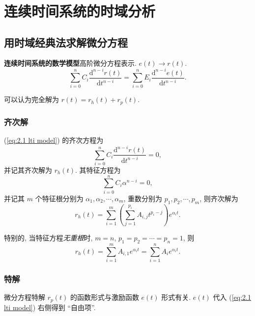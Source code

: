 \section{连续时间系统的时域分析} \label{连续时间系统的时域分析}
\subsection{用时域经典法求解微分方程} \label{用时域经典法求解微分方程}

\textbf{连续时间系统的数学模型}\quad 高阶微分方程表示. $e(t)\rightarrow r(t)$.
\begin{equation} \label{eq:2.1 lti model}
    \sum_{i=0}^{n}C_i\frac{\mathrm{d}^{n-i}r(t)}{\mathrm{d}t^{n-i}}=\sum_{i=0}^{n}E_i\frac{\mathrm{d}^{n-i}e(t)}{\mathrm{d}t^{n-i}}.
\end{equation}

可以认为完全解为 $r(t)=r_h(t)+r_p(t)$.

\subsubsection{齐次解}
(\ref{eq:2.1 lti model}) 的齐次方程为
\begin{equation}
    \sum_{i=0}^{n}C_i\frac{\mathrm{d}^{n-i}r(t)}{\mathrm{d}t^{n-i}}=0,
\end{equation}
并记其齐次解为 $r_h(t)$. 其特征方程为
\begin{equation}
    \sum_{i=0}^{n}C_i\alpha^{n-i}=0,
\end{equation}
并记其 $m$ 个特征根分别为 $\alpha_1,\alpha_2,\cdots,\alpha_m$, 重数分别为 $p_1,p_2,\cdots,p_m$, 则齐次解为
\begin{equation} \label{eq:2.1 lti model r_h}
    r_h(t)=\sum_{i=1}^{m}\left(\sum_{j=1}^{p_i}A_{i,j}t^{p_i-j}\right)e^{\alpha_i t}.
\end{equation}

特别的, 当特征方程\textit{无重根}时, $m=n$, $p_1=p_2=\cdots=p_n=1$, 则
\begin{equation}
    r_h(t)=\sum_{i=1}^{m}A_{i,1} e^{\alpha_i t}=\sum_{i=1}^{n}A_i e^{\alpha_i t}.
\end{equation}

\subsubsection{特解}
微分方程特解 $r_p(t)$ 的函数形式与激励函数 $e(t)$ 形式有关. $e(t)$ 代入 (\ref{eq:2.1 lti model}) 右侧得到 ``自由项''.

